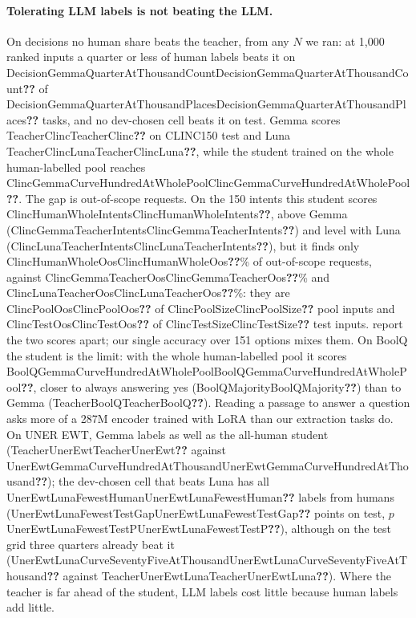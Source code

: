 \documentclass[11pt]{article}
\newcommand{\res}[1]{\ifcsname #1\endcsname\csname #1\endcsname\else\textbf{??}\fi}
\begin{document}
\paragraph{Tolerating LLM labels is not beating the LLM.} On decisions no human share beats the teacher, from any $N$ we ran: at 1{,}000 ranked inputs a quarter or less of human labels beats it on \res{DecisionGemmaQuarterAtThousandCount} of \res{DecisionGemmaQuarterAtThousandPlaces} tasks, and no dev-chosen cell beats it on test. Gemma scores \res{TeacherClinc} on CLINC150 test and Luna \res{TeacherClincLuna}, while the student trained on the whole human-labelled pool reaches \res{ClincGemmaCurveHundredAtWholePool}. The gap is out-of-scope requests. On the 150 intents this student scores \res{ClincHumanWholeIntents}, above Gemma (\res{ClincGemmaTeacherIntents}) and level with Luna (\res{ClincLunaTeacherIntents}), but it finds only \res{ClincHumanWholeOos}\% of out-of-scope requests, against \res{ClincGemmaTeacherOos}\% and \res{ClincLunaTeacherOos}\%: they are \res{ClincPoolOos} of \res{ClincPoolSize} pool inputs and \res{ClincTestOos} of \res{ClincTestSize} test inputs. \citet{larson2019clinc} report the two scores apart; our single accuracy over 151 options mixes them. On BoolQ the student is the limit: with the whole human-labelled pool it scores \res{BoolQGemmaCurveHundredAtWholePool}, closer to always answering yes (\res{BoolQMajority}) than to Gemma (\res{TeacherBoolQ}). Reading a passage to answer a question asks more of a 287M encoder trained with LoRA than our extraction tasks do. On UNER EWT, Gemma labels as well as the all-human student (\res{TeacherUnerEwt} against \res{UnerEwtGemmaCurveHundredAtThousand}); the dev-chosen cell that beats Luna has all \res{UnerEwtLunaFewestHuman} labels from humans (\res{UnerEwtLunaFewestTestGap} points on test, $p$\,\res{UnerEwtLunaFewestTestP}), although on the test grid three quarters already beat it (\res{UnerEwtLunaCurveSeventyFiveAtThousand} against \res{TeacherUnerEwtLuna}). Where the teacher is far ahead of the student, LLM labels cost little because human labels add little.
\end{document}
